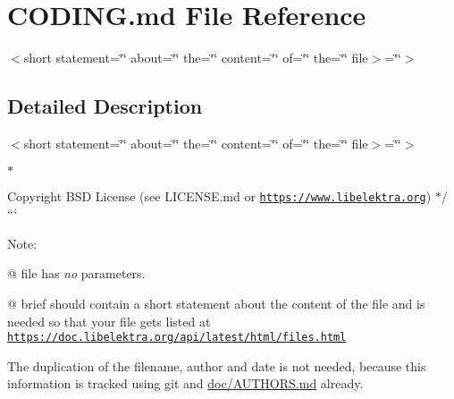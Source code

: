 \hypertarget{CODING_8md}{}\section{C\+O\+D\+I\+N\+G.\+md File Reference}
\label{CODING_8md}


$<$short statement=\char`\"{}\char`\"{} about=\char`\"{}\char`\"{} the=\char`\"{}\char`\"{} content=\char`\"{}\char`\"{} of=\char`\"{}\char`\"{} the=\char`\"{}\char`\"{} file$>$=\char`\"{}\char`\"{}$>$
\begin{DoxyItemize}
\item 
\end{DoxyItemize} 




\subsection{Detailed Description}
$<$short statement=\char`\"{}\char`\"{} about=\char`\"{}\char`\"{} the=\char`\"{}\char`\"{} content=\char`\"{}\char`\"{} of=\char`\"{}\char`\"{} the=\char`\"{}\char`\"{} file$>$=\char`\"{}\char`\"{}$>$
\begin{DoxyItemize}
\item 
\end{DoxyItemize}


\begin{DoxyItemize}
\item 
\item $\ast$ \begin{DoxyCopyright}{Copyright}
B\+SD License (see L\+I\+C\+E\+N\+S\+E.\+md or \href{https://www.libelektra.org}{\tt https\+://www.\+libelektra.\+org}) $\ast$/ ```
\end{DoxyCopyright}
Note\+:
\end{DoxyItemize}

{\ttfamily @} {\ttfamily file} has {\itshape no} parameters.
\begin{DoxyItemize}
\item {\ttfamily @} {\ttfamily brief} should contain a short statement about the content of the file and is needed so that your file gets listed at \href{https://doc.libelektra.org/api/latest/html/files.html}{\tt https\+://doc.\+libelektra.\+org/api/latest/html/files.\+html}
\end{DoxyItemize}

The duplication of the filename, author and date is not needed, because this information is tracked using git and \hyperlink{doc_AUTHORS_md}{doc/\+A\+U\+T\+H\+O\+RS.md} already. 